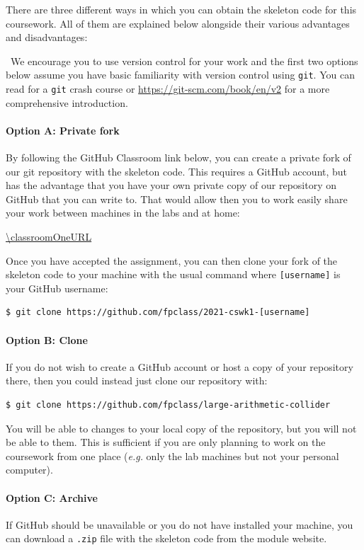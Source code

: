 There are three different ways in which you can obtain the skeleton code for this coursework. All of them are explained below alongside their various advantages and disadvantages:

\makebox[0.5cm]{\faInfoCircle}~We encourage you to use version control for your work and the first two options below assume you have basic familiarity with version control using \texttt{\small git}. You can read  for a \texttt{\small git} crash course or {\small \url{https://git-scm.com/book/en/v2}} for a more comprehensive introduction.

\paragraph{Option A: Private fork} By following the GitHub Classroom link below, you can create a private fork of our git repository with the skeleton code. This requires a GitHub account, but has the advantage that you have your own private copy of our repository on GitHub that you can write to. That would allow then you to work easily share your work between machines in the labs and at home:
\begin{center}
	\small
	\url{\classroomOneURL}
\end{center}
Once you have accepted the assignment, you can then clone your fork of the skeleton code to your machine with the usual  command where \texttt{\small [username]} is your GitHub username:
\begin{verbatim}
$ git clone https://github.com/fpclass/2021-cswk1-[username]
\end{verbatim}
\paragraph{Option B: Clone} If you do not wish to create a GitHub account or host a copy of your repository there, then you could instead just clone our repository with:
\begin{verbatim}
$ git clone https://github.com/fpclass/large-arithmetic-collider
\end{verbatim}
You will be able to  changes to your local copy of the repository, but you will not be able to  them. This is sufficient if you are only planning to work on the coursework from one place (\emph{e.g.} only the lab machines but not your personal computer).

\paragraph{Option C: Archive} If GitHub should be unavailable or you do not have  installed your machine, you can download a \texttt{\small .zip} file with the skeleton code from the module website.

